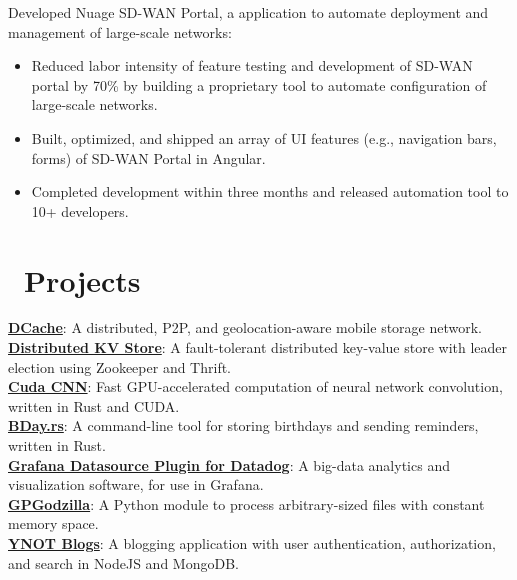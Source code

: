 \documentclass{resume}
\begin{document}
{  
  Developed Nuage SD-WAN Portal, a application to automate deployment and management of large-scale networks:
  \begin{itemize}
    \item {Reduced labor intensity of feature testing and development of SD-WAN portal by 70\%
          by building a proprietary tool to automate configuration of large-scale networks.}
    \item {Built, optimized, and shipped an array of UI features (e.g., navigation bars, forms) of SD-WAN Portal in Angular.}
    \item {Completed development within three months and released automation tool to 10+ developers.}
  \end{itemize}

  \par
 }

\section{\faCodeFork\ Projects}
 {

  \fontsize{10.5pt}{1.25}\selectfont
  \href{https://drive.google.com/file/d/1Svd-wbXZiO84QmVKnKBp1cClJb2uvtWT/view?usp=sharing}{\textbf{DCache}}: A distributed, P2P, and geolocation-aware mobile storage network. \\
  \href{https://github.com/yirzhou/KVStore}{\textbf{Distributed KV Store}}: A fault-tolerant distributed key-value store with leader election using Zookeeper and Thrift. \\
  \href{https://github.com/yirzhou/CudaCNN}{\textbf{Cuda CNN}}: Fast GPU-accelerated computation of neural network convolution, written in Rust and CUDA. \\
  \href{https://github.com/yirzhou/IsolatedSoul/tree/main/rsbday}{\textbf{BDay.rs}}: A command-line tool for storing birthdays and sending reminders, written in Rust. \\
  \href{https://github.com/Enflick/grafana-datasource-datadog/pull/7}{\textbf{Grafana Datasource Plugin for Datadog}}: A big-data analytics and visualization software, for use in Grafana. \\
  \href{https://pypi.org/project/gpgodzilla/}{\textbf{GPGodzilla}}: A Python module to process arbitrary-sized files with constant memory space. \\
  \href{http://ynotblogs.herokuapp.com/blogs}{\textbf{YNOT Blogs}}: A blogging application with user authentication, authorization, and search in NodeJS and MongoDB.
  \par
 }
\end{document}
